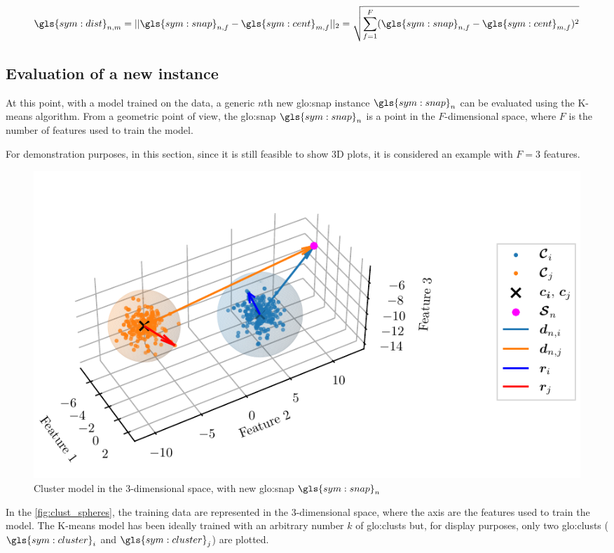 \begin{equation}
  \label{eq:clust_dist}
  \gls{sym:dist}_{n,m} = ||\gls{sym:snap}_{n,f} - \gls{sym:cent}_{m,f}||_2 = \sqrt{\sum_{f=1}^{F} (\gls{sym:snap}_{n,f} - \gls{sym:cent}_{m,f})^2}
\end{equation}

\subsection{Evaluation of a new instance}

At this point, with a model trained on the data, a generic $n$th new {\gls{glo:snap}} instance $\gls{sym:snap}_n$ can be evaluated using the K-means algorithm.
From a geometric point of view, the {\gls{glo:snap}} $\gls{sym:snap}_n$ is a point in the ${F}$-dimensional space, where ${F}$ is the number of features used to train the model.

For demonstration purposes, in this section, since it is still feasible to show 3D plots, it is considered an example with ${F}=3$ features.

\begin{figure}[htbp]
  \centering
  \includegraphics[width=\textwidth]{images/Kmeans/Spheres_2.pdf}
  \caption{Cluster model in the $3$-dimensional space, with new \gls{glo:snap} $\gls{sym:snap}_n$}
  \label{fig:clust_spheres}
\end{figure}

In the \autoref{fig:clust_spheres}, the training data are represented in the $3$-dimensional space, where the axis are the features used to train the model. The K-means model has been ideally trained with an arbitrary number $k$ of \gls{glo:clust}s but, for display purposes, only two \gls{glo:clust}s  ($\gls{sym:cluster}_i$ and $\gls{sym:cluster}_j$) are plotted.
